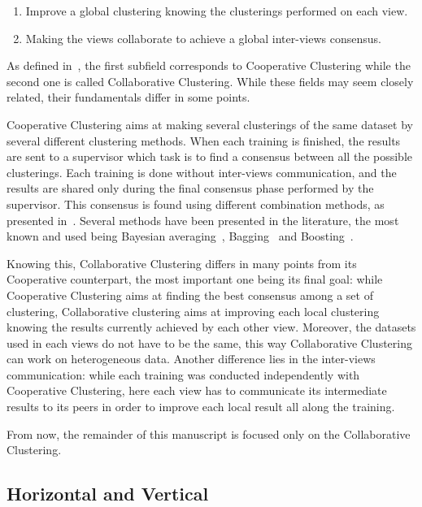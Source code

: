     \begin{enumerate}
        \item Improve a global clustering knowing the clusterings performed on each view.
        \item Making the views collaborate to achieve a global inter-views consensus.
    \end{enumerate}

    As defined in~\cite{cornuejols2018collaborative}, the first subfield corresponds to Cooperative Clustering while the second one is called Collaborative Clustering. While these fields may seem closely related, their fundamentals differ in some points.

    Cooperative Clustering aims at making several clusterings of the same dataset by several different clustering methods. When each training is finished, the results are sent to a supervisor which task is to find a consensus between all the possible clusterings. Each training is done without inter-views communication, and the results are shared only during the final consensus phase performed by the supervisor. This consensus is found using different combination methods, as presented in~\cite{kittler1998combining,dietterich2000ensemble}. Several methods have been presented in the literature, the most known and used being Bayesian averaging~\cite{kittler1998combining}, Bagging~\cite{breiman1996bagging} and Boosting~\cite{freund1997decision}.

    Knowing this, Collaborative Clustering differs in many points from its Cooperative counterpart, the most important one being its final goal: while Cooperative Clustering aims at finding the best consensus among a set of clustering, Collaborative clustering aims at improving each local clustering knowing the results currently achieved by each other view. Moreover, the datasets used in each views do not have to be the same, this way Collaborative Clustering can work on heterogeneous data. Another difference lies in the inter-views communication: while each training was conducted independently with Cooperative Clustering, here each view has to communicate its intermediate results to its peers in order to improve each local result all along the training.
    
    From now, the remainder of this manuscript is focused only on the Collaborative Clustering.

    \subsection{Horizontal and Vertical}
\label{sec:cc_hor_ver}


